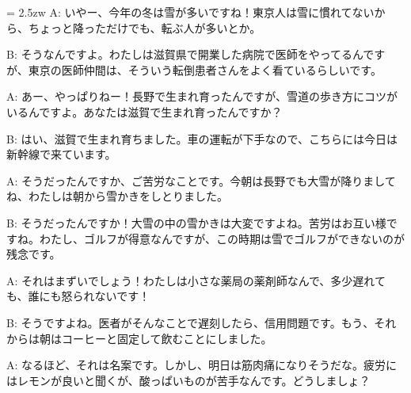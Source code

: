 \documentclass[11pt]{amsart}
\title{}
\author{}
\newenvironment{hangall}[1]{\hangindent = 2.5zw\everypar{\hangindent = 2.5zw}}{}
\begin{document}
\maketitle
\begin{hangall}{}%
A: いやー、今年の冬は雪が多いですね！東京人は雪に慣れてないから、ちょっと降っただけでも、転ぶ人が多いとか。



B: そうなんですよ。わたしは滋賀県で開業した病院で医師をやってるんですが、東京の医師仲間は、そういう転倒患者さんをよく看ているらしいです。



A: あー、やっぱりねー！長野で生まれ育ったんですが、雪道の歩き方にコツがいるんですよ。あなたは滋賀で生まれ育ったんですか？



B: はい、滋賀で生まれ育ちました。車の運転が下手なので、こちらには今日は新幹線で来ています。



A: そうだったんですか、ご苦労なことです。今朝は長野でも大雪が降りましてね、わたしは朝から雪かきをしとりました。



B: そうだったんですか！大雪の中の雪かきは大変ですよね。苦労はお互い様ですね。わたし、ゴルフが得意なんですが、この時期は雪でゴルフができないのが残念です。



A: それはまずいでしょう！わたしは小さな薬局の薬剤師なんで、多少遅れても、誰にも怒られないです！



B: そうですよね。医者がそんなことで遅刻したら、信用問題です。もう、それからは朝はコーヒーと固定して飲むことにしました。



A: なるほど、それは名案です。しかし、明日は筋肉痛になりそうだな。疲労にはレモンが良いと聞くが、酸っぱいものが苦手なんです。どうしましょ？\end{hangall}
\end{document}
